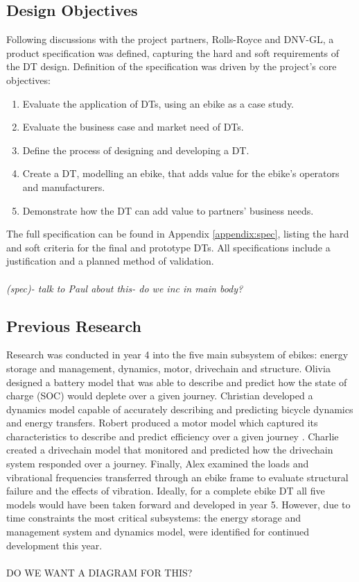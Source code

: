 \documentclass[a4paper, 10pt]{article}
\numberwithin{equation}{section}
\begin{document}
\subsection{Design Objectives} 

Following discussions with the project partners, Rolls-Royce and DNV-GL, a product specification was defined, capturing the hard and soft requirements of the DT design. Definition of the specification was driven by the project's core objectives: 

\begin{enumerate}
    \item Evaluate the application of DTs, using an ebike as a case study.
    \item Evaluate the business case and market need of DTs.
    \item Define the process of designing and developing a DT.
    \item Create a DT, modelling an ebike, that adds value for the ebike's operators and manufacturers.
    \item Demonstrate how the DT can add value to partners' business needs.
\end{enumerate}

The full specification can be found in Appendix \ref{appendix:spec}, listing  the hard and soft criteria for the final and prototype DTs. All specifications include a justification and a planned method of validation.
\\\\
\textit{(spec)- talk to Paul about this- do we inc in main body?}

\subsection{Previous Research}

Research was conducted in year 4 into the five main subsystem of ebikes: energy storage and management, dynamics, motor, drivechain and structure. Olivia designed a battery model that was able to describe and predict how the state of charge (SOC) would deplete over a given journey\cite{report:energy}. Christian developed a dynamics model capable of accurately describing and predicting bicycle dynamics and energy transfers\cite{report:dynamics}. Robert produced a motor model which captured its characteristics to describe and predict efficiency over a given journey \cite{report:motor}. Charlie created a drivechain model that monitored and predicted how the drivechain system responded over a journey\cite{report:drivechain}. Finally, Alex examined the loads and vibrational frequencies transferred through an ebike frame to evaluate structural failure and the effects of vibration\cite{report:structural}. Ideally, for a complete ebike DT all five models would have been taken forward and developed in year 5. However, due to time constraints the most critical subsystems: the energy storage and management system and dynamics model, were identified for continued development this year.
\\ \\
DO WE WANT A DIAGRAM FOR THIS?
\end{document}
